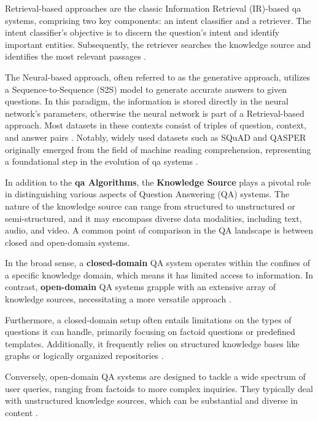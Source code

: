 Retrieval-based approaches are the classic Information Retrieval (IR)-based \gls{qa} systems, comprising two key components: an intent classifier and a retriever. The intent classifier's objective is to discern the question's intent and identify important entities. Subsequently, the retriever searches the knowledge source and identifies the most relevant passages \cite{farea_evaluation_2022, zhu_retrieving_2021}.

The Neural-based approach, often referred to as the generative approach, utilizes a Sequence-to-Sequence (S2S) model to generate accurate answers to given questions. In this paradigm, the information is stored directly in the neural network's parameters, otherwise the neural network is part of a Retrieval-based approach. Most datasets in these contexts consist of triples of question, context, and answer pairs \cite{jurafsky_speech_2023}. Notably, widely used datasets such as SQuAD and QASPER originally emerged from the field of machine reading comprehension, representing a foundational step in the evolution of \gls{qa} systems \cite{rajpurkar_squad_2016, dasigi_dataset_2021, zhu_retrieving_2021}.

In addition to the \textbf{\gls{qa} Algorithms}, the \textbf{Knowledge Source} plays a pivotal role in distinguishing various aspects of Question Answering (QA) systems. The nature of the knowledge source can range from structured to unstructured or semi-structured, and it may encompass diverse data modalities, including text, audio, and video. A common point of comparison in the QA landscape is between closed and open-domain systems.

In the broad sense, a \textbf{closed-domain} QA system operates within the confines of a specific knowledge domain, which means it has limited access to information. In contrast, \textbf{open-domain} QA systems grapple with an extensive array of knowledge sources, necessitating a more versatile approach \cite{farea_evaluation_2022}.

Furthermore, a closed-domain setup often entails limitations on the types of questions it can handle, primarily focusing on factoid questions or predefined templates. Additionally, it frequently relies on structured knowledge bases like graphs or logically organized repositories \cite{hao_recent_2022}.

Conversely, open-domain QA systems are designed to tackle a wide spectrum of user queries, ranging from factoids to more complex inquiries. They typically deal with unstructured knowledge sources, which can be substantial and diverse in content \cite{zhu_retrieving_2021, farea_evaluation_2022, jurafsky_speech_2023}.

